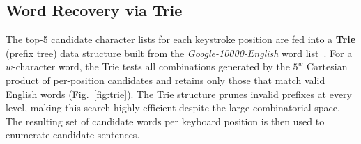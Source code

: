 \documentclass[conference]{IEEEtran}
\begin{document}
\subsection{Word Recovery via Trie}

The top-5 candidate character lists for each keystroke position are fed into a \textbf{Trie} (prefix tree) data structure built from the \textit{Google-10000-English} word list~\cite{norvig2011google}. For a $w$-character word, the Trie tests all combinations generated by the $5^w$ Cartesian product of per-position candidates and retains only those that match valid English words (Fig.~\ref{fig:trie}). The Trie structure prunes invalid prefixes at every level, making this search highly efficient despite the large combinatorial space. The resulting set of candidate words per keyboard position is then used to enumerate candidate sentences.
\end{document}
